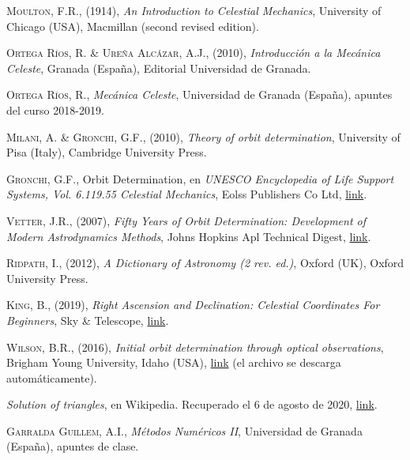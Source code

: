 \documentclass[11pt]{book}
\begin{document}
\begin{thebibliography}{99}
 \textsc{Moulton, F.R.}, (1914), \textit{An Introduction to Celestial Mechanics}, University of Chicago (USA), Macmillan (second revised edition).

 \textsc{Ortega Ríos, R. \& Ureña Alcázar, A.J.}, (2010), \textit{Introducción a la Mecánica Celeste}, Granada (España), Editorial Universidad de Granada.

 \textsc{Ortega Ríos, R.}, \textit{Mecánica Celeste}, Universidad de Granada (España), apuntes del curso 2018-2019.

 \textsc{Milani, A. \& Gronchi, G.F.}, (2010), \textit{Theory of
orbit determination}, University of Pisa (Italy), Cambridge University Press.

 \textsc{Gronchi, G.F.}, Orbit Determination, en \textit{UNESCO Encyclopedia of Life Support Systems, Vol. 6.119.55 Celestial Mechanics}, Eolss Publishers Co Ltd, \href{http://adams.dm.unipi.it/~gronchi/PDF/gronchi_unesco.pdf}{link}.

 \textsc{Vetter, J.R.}, (2007), \textit{Fifty Years of Orbit Determination: Development of Modern Astrodynamics Methods}, Johns Hopkins Apl Technical Digest, \href{https://www.jhuapl.edu/Content/techdigest/pdf/V27-N03/27-03-Vetter.pdf}{link}.

 \textsc{Ridpath, I.}, (2012), \textit{A Dictionary of Astronomy (2 rev. ed.)}, Oxford (UK), Oxford University Press.

 \textsc{King, B.}, (2019), \textit{Right Ascension and Declination: Celestial Coordinates For Beginners}, Sky \& Telescope, \href{https://skyandtelescope.org/astronomy-resources/right-ascension-declination-celestial-coordinates/}{link}.

 \textsc{Wilson, B.R.}, (2016), \textit{Initial orbit determination through optical observations}, Brigham Young University, Idaho (USA), \href{https://www.byui.edu/documents/physics/Theses/Brett_WilsonS16.pdf}{link} (el archivo se descarga automáticamente).

 \textit{Solution of triangles}, en Wikipedia. Recuperado el 6 de agosto de 2020, \href{https://en.wikipedia.org/wiki/Solution_of_triangles#A_side_and_two_adjacent_angles_given_(ASA)}{link}.

 \textsc{Garralda Guillem, A.I.}, \textit{Métodos Numéricos II}, Universidad de Granada (España), apuntes de clase.


\end{thebibliography}
\end{document}
